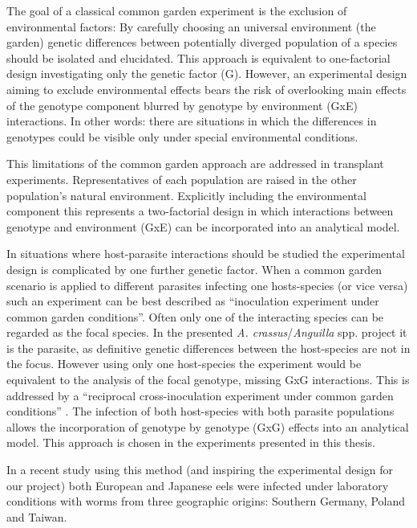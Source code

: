 The goal of a classical common garden experiment is the exclusion of
environmental factors: By carefully choosing an universal environment
(the garden) genetic differences between potentially diverged
population of a species should be isolated and elucidated. This
approach is equivalent to one-factorial design investigating only the
genetic factor (G). However, an experimental design aiming to exclude
environmental effects bears the risk of overlooking main effects of
the genotype component blurred by genotype by environment (GxE)
interactions. In other words: there are situations in which the
differences in genotypes could be visible only under special
environmental conditions.

This limitations of the common garden approach are addressed in
transplant experiments. Representatives of each population are raised
in the other population's natural environment. Explicitly including
the environmental component this represents a two-factorial design in
which interactions between genotype and environment (GxE) can be
incorporated into an analytical model.

In situations where host-parasite interactions should be studied the
experimental design is complicated by one further genetic factor.
When a common garden scenario is applied to different parasites
infecting one hosts-species (or vice versa) such an experiment can be
best described as ``inoculation experiment under common garden
conditions''. Often only one of the interacting species can be
regarded as the focal species. In the presented
\textit{A. crassus}/\textit{Anguilla} spp. project it is the parasite,
as definitive genetic differences between the host-species are not in
the focus. However using only one host-species the experiment would be
equivalent to the analysis of the focal genotype, missing GxG
interactions. This is addressed by a ``reciprocal cross-inoculation
experiment under common garden conditions'' \cite{kaltz_shykoff_rev}.
The infection of both host-species with both parasite populations
allows the incorporation of genotype by genotype (GxG) effects into an
analytical model. This approach is chosen in the experiments presented
in this thesis.

In a recent study using this method (and inspiring the experimental
design for our project) both European and Japanese eels were infected
under laboratory conditions with worms from three geographic origins:
Southern Germany, Poland and Taiwan.



